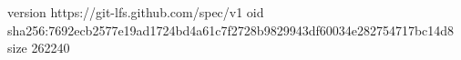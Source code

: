 version https://git-lfs.github.com/spec/v1
oid sha256:7692ecb2577e19ad1724bd4a61c7f2728b9829943df60034e282754717bc14d8
size 262240
